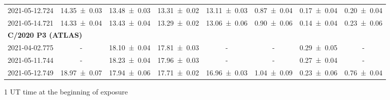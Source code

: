 \begin{table}
\begin{threeparttable}
{\begin{tabular}{cccccccc}
            2021-05-12.724 & \num{14.35 +- 0.03} & \num{13.48 +- 0.03} & \num{13.31 +- 0.02} & \num{13.11 +- 0.03} & \num{0.87 +- 0.04} & \num{0.17 +- 0.04} & \num{0.20 +- 0.04} \\
            2021-05-14.721 & \num{14.33 +- 0.04} & \num{13.43 +- 0.04} & \num{13.29 +- 0.02} & \num{13.06 +- 0.06} & \num{0.90 +- 0.06} & \num{0.14 +- 0.04} & \num{0.23 +- 0.06} \\
            \multicolumn{8}{l}{\textbf{C/2020 P3 (ATLAS)}} \\
            2021-04-02.775 & - & \num{18.10 +- 0.04} & \num{17.81 +- 0.03} & - & - & \num{0.29 +- 0.05} & - \\
            2021-05-11.744 & - & \num{18.23 +- 0.04} & \num{17.96 +- 0.03} & - & - & \num{0.27 +- 0.04} & - \\
            2021-05-12.749 & \num{18.97 +- 0.07} & \num{17.94 +- 0.06} & \num{17.71 +- 0.02} & \num{16.96 +- 0.03} & \num{1.04 +- 0.09} & \num{0.23 +- 0.06} & \num{0.76 +- 0.04} \\
            \bottomrule
        \end{tabular}
        }
        \begin{tablenotes}
            \item[1] UT time at the beginning of exposure
        \end{tablenotes}
    \end{threeparttable}
\end{table}


